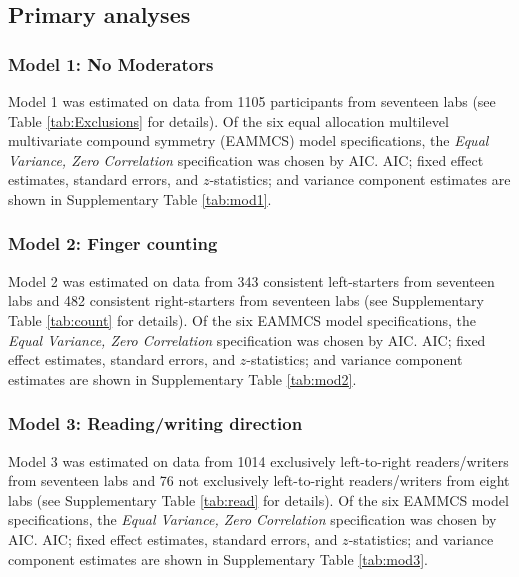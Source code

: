 \documentclass[man,floatsintext]{apa6}
\theoremstyle{definition}
\theoremstyle{definition}
\theoremstyle{definition}
\theoremstyle{remark}
\begin{document}
\begin{appendix}
\section{}
\renewcommand{\thetable}{S\arabic{table}}
\renewcommand{\thefigure}{S\arabic{figure}}


\subsection{Primary analyses}\label{primary-analyses}

\subsubsection{Model 1: No Moderators}\label{model-1-no-moderators}

Model 1 was estimated on data from 1105 participants from seventeen labs
(see Table \ref{tab:Exclusions} for details). Of the six equal
allocation multilevel multivariate compound symmetry (EAMMCS) model
specifications, the \emph{Equal Variance, Zero Correlation}
specification was chosen by AIC. AIC; fixed effect estimates, standard
errors, and \(z\)-statistics; and variance component estimates are shown
in Supplementary Table \ref{tab:mod1}.

\subsubsection{Model 2: Finger counting}\label{model-2-finger-counting}

Model 2 was estimated on data from 343 consistent left-starters from
seventeen labs and 482 consistent right-starters from seventeen labs
(see Supplementary Table \ref{tab:count} for details). Of the six EAMMCS
model specifications, the \emph{Equal Variance, Zero Correlation}
specification was chosen by AIC. AIC; fixed effect estimates, standard
errors, and \(z\)-statistics; and variance component estimates are shown
in Supplementary Table \ref{tab:mod2}.

\subsubsection{Model 3: Reading/writing
direction}\label{model-3-readingwriting-direction}

Model 3 was estimated on data from 1014 exclusively left-to-right
readers/writers from seventeen labs and 76 not exclusively left-to-right
readers/writers from eight labs (see Supplementary Table \ref{tab:read}
for details). Of the six EAMMCS model specifications, the \emph{Equal
Variance, Zero Correlation} specification was chosen by AIC. AIC; fixed
effect estimates, standard errors, and \(z\)-statistics; and variance
component estimates are shown in Supplementary Table \ref{tab:mod3}.


\end{appendix}
\end{document}
